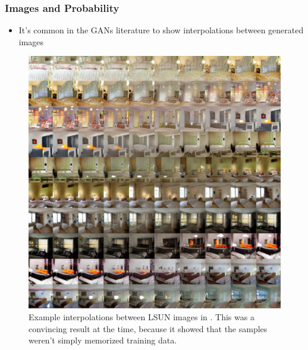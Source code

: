 \documentclass[10pt,mathserif]{beamer}
\begin{document}
\begin{frame}
  \frametitle{Images and Probability}
\begin{itemize}
\item It's common in the GANs literature to show interpolations between
  generated images
\end{itemize}
\begin{figure}[ht]
  \centering
  \includegraphics[width=0.35\paperwidth]{figure/gan_image_interpolations}
  \caption{Example interpolations between LSUN images in
    \citep{radford2015unsupervised}. This was a convincing result at the time,
    because it showed that the samples weren't simply memorized training
    data. \label{fig:gan_interpolations} }
\end{figure}
\end{frame}
\end{document}
